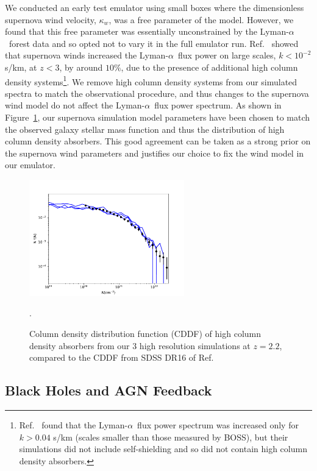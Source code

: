 \documentclass[a4paper,11pt]{article}
\newcommand{\Lya}{Lyman-$\alpha$}
\begin{document}
We conducted an early test emulator using small boxes where the dimensionless supernova wind velocity, $\kappa_w$, was a free parameter of the model. However, we found that this free parameter was essentially unconstrained by the \Lya~forest data and so opted not to vary it in the full emulator run. Ref.~\cite{Bolton:2017} showed that supernova winds increased the \Lya~flux power on large scales, $k < 10^{-2}$ s/km, at $z < 3$, by around $10\%$, due to the presence of additional high column density systems\footnote{Ref.~\cite{Viel:2013} found that the \Lya~flux power spectrum was increased only for $ k > 0.04$ s/km (scales smaller than those measured by BOSS), but their simulations did not include self-shielding and so did not contain high column density absorbers.}. We remove high column density systems from our simulated spectra to match the observational procedure, and thus changes to the supernova wind model do not affect the \Lya~flux power spectrum. As shown in Figure~\ref{fig:DLACDDF}, our supernova simulation model parameters have been chosen to match the observed galaxy stellar mass function and thus the distribution of high column density absorbers. This good agreement can be taken as a strong prior on the supernova wind parameters and justifies our choice to fix the wind model in our emulator.

\begin{figure}
\centering
\includegraphics[width=0.6\textwidth]{figures/cddf_hires.pdf}
 \caption{Column density distribution function (CDDF) of high column density absorbers from our $3$ high resolution simulations at $z=2.2$, compared to the CDDF from SDSS DR16 of Ref.~\cite{2021MNRAS.507..704H}}.
 \label{fig:DLACDDF}
\end{figure}

\subsection{Black Holes and AGN Feedback}
\label{sec:agn}
\end{document}
